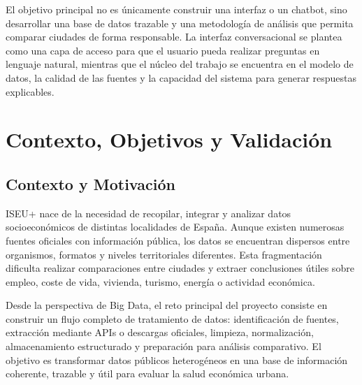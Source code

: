 El objetivo principal no es únicamente construir una interfaz o un chatbot, sino desarrollar una base de datos trazable y una metodología de análisis que permita comparar ciudades de forma responsable. La interfaz conversacional se plantea como una capa de acceso para que el usuario pueda realizar preguntas en lenguaje natural, mientras que el núcleo del trabajo se encuentra en el modelo de datos, la calidad de las fuentes y la capacidad del sistema para generar respuestas explicables.

\chapter{Contexto, Objetivos y Validación}

\section{Contexto y Motivación}

ISEU+ nace de la necesidad de recopilar, integrar y analizar datos socioeconómicos de distintas localidades de España. Aunque existen numerosas fuentes oficiales con información pública, los datos se encuentran dispersos entre organismos, formatos y niveles territoriales diferentes. Esta fragmentación dificulta realizar comparaciones entre ciudades y extraer conclusiones útiles sobre empleo, coste de vida, vivienda, turismo, energía o actividad económica.

Desde la perspectiva de Big Data, el reto principal del proyecto consiste en construir un flujo completo de tratamiento de datos: identificación de fuentes, extracción mediante APIs o descargas oficiales, limpieza, normalización, almacenamiento estructurado y preparación para análisis comparativo. El objetivo es transformar datos públicos heterogéneos en una base de información coherente, trazable y útil para evaluar la salud económica urbana.

